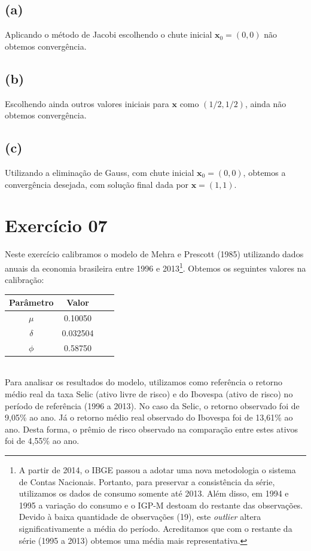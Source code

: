 \documentclass{article}
\begin{document}
\subsection*{(a)}

Aplicando o método de Jacobi escolhendo o chute inicial $\mathbf{x}_0 = (0, 0)$ não obtemos convergência. 

\subsection*{(b)}

Escolhendo ainda outros valores iniciais para $\mathbf{x}$ como $(1/2, 1/2)$, ainda não obtemos convergência.

\subsection*{(c)}

Utilizando a eliminação de Gauss, com chute inicial $\mathbf{x}_0 = (0, 0)$, obtemos a convergência desejada, 
com solução final dada por $\mathbf{x} = (1, 1)$.

\section*{Exercício 07}

Neste exercício calibramos o modelo de Mehra e Prescott (1985) utilizando dados anuais da economia 
brasileira entre 1996 e 2013\footnote{A partir de 2014, o IBGE passou a adotar uma nova metodologia 
o sistema de Contas Nacionais. Portanto, para preservar a consistência da série, utilizamos os dados 
de consumo somente até 2013. Além disso, em 1994 e 1995 a variação do consumo e o IGP-M 
destoam do restante das observações. Devido à baixa quantidade de observações (19), 
este \textit{outlier} altera significativamente a média do período.
Acreditamos que com o restante da série (1995 a 2013) obtemos uma média mais representativa.}. 
Obtemos os seguintes valores na calibração: \\ 

\begin{tabular}{ c c c c }
Parâmetro & Valor \\ \hline 
$\mu$ & 0.10050 \\
$\delta$ & 0.032504 \\
$\phi$ & 0.58750
\end{tabular} \\

Para analisar os resultados do modelo, utilizamos como referência o retorno médio real da 
taxa Selic (ativo livre de risco) e do Ibovespa (ativo de risco) no período 
de referência (1996 a 2013). No caso da Selic, o retorno observado foi de 9,05\% ao ano. 
Já o retorno médio real observado do Ibovespa foi de 13,61\% ao ano. Desta forma, o
prêmio de risco observado na comparação entre estes ativos foi de 4,55\% ao ano.
\end{document}
